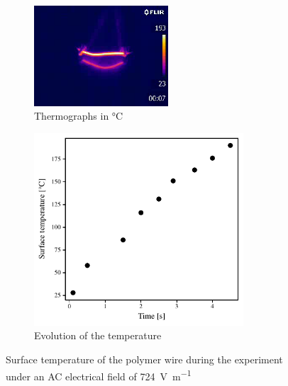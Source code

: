 \documentclass[11pt,review,times]{elsarticle}
\begin{document}
\begin{figure}[htb]
	\center
	\captionsetup{width=125mm}
	\begin{subfigure}{60mm}
		\center
		\captionsetup{width=50mm}
		\includegraphics[width=50mm]{output0036}
		\caption{Thermographs in \si{\celsius} \cite{Brassard2018_thermograph}}
		\label{fig:results_thermal}
	\end{subfigure}
	\begin{subfigure}{80mm}
		\center
		\captionsetup{width=78mm}
		\includegraphics[width=78mm]{temperature_over_time.pdf}
		\caption{Evolution of the temperature}
		\label{fig:temp_over_time}
	\end{subfigure}%
	\caption{Surface temperature of the polymer wire during the experiment under an AC electrical field of \SI{724}{\volt\per\metre}}
	\label{fig:results_lab}
\end{figure}
\end{document}
